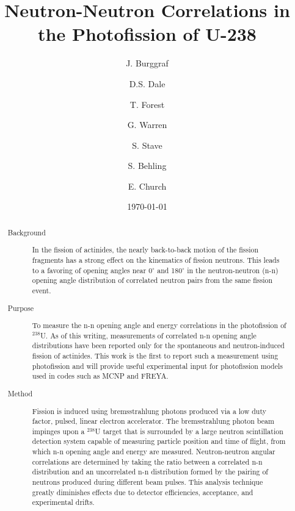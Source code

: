 \documentclass[%
 reprint,
 calc,
 amsmath,amssymb,
 aps,
 nofootinbib,
 linenumbers
]{revtex4-1}
\begin{document}

\title{Neutron-Neutron Correlations in the Photofission of U-238
}


\author{J. Burggraf}
\author{D.S. Dale}
\author{T. Forest}

\author{G. Warren}
\author{S. Stave}
\author{S. Behling}
\author{E. Church}

\date{\today}
\begin{abstract}
    \begin{description}
        \item[Background] In the fission of actinides, the nearly back-to-back motion of the fission fragments has a strong effect on the kinematics of fission neutrons.
        This leads to a favoring of opening angles near 0$^{\circ}$ and 180$^{\circ}$ in the neutron-neutron (n-n) opening angle distribution of correlated neutron pairs from the same fission event.
        
        \item[Purpose] To measure the n-n opening angle and energy correlations in the photofission of $^{238}$U.
        As of this writing, measurements of correlated n-n opening angle distributions have been reported only for the spontaneous and neutron-induced fission of actinides.
        This work is the first to report such a measurement using photofission and will provide useful experimental input for photofission models used in codes such as MCNP and FREYA.

        \item[Method] Fission is induced using bremsstrahlung photons produced via a low duty factor, pulsed, linear electron accelerator.
        The bremsstrahlung photon beam impinges upon a $^{238}$U target that is surrounded by a large neutron scintillation detection system capable of measuring particle position and time of flight, from which n-n opening angle and energy are measured.
Neutron-neutron angular correlations are determined by taking the ratio between a correlated n-n distribution and an uncorrelated n-n distribution formed by the pairing of neutrons produced during different beam pulses.
        This analysis technique greatly diminishes effects due to detector efficiencies, acceptance, and experimental drifts.


\end{description}
\end{abstract}
\end{document}

